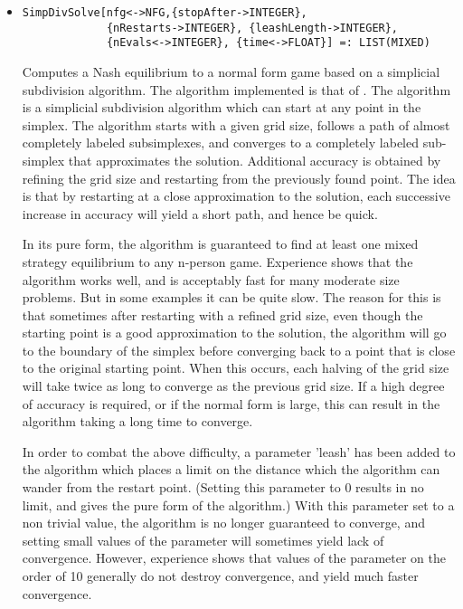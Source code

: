 \begin{itemize}
\item
\protect \large \begin{verbatim}
SimpDivSolve[nfg<->NFG,{stopAfter->INTEGER}, 
             {nRestarts->INTEGER}, {leashLength->INTEGER},
             {nEvals<->INTEGER}, {time<->FLOAT}] =: LIST(MIXED)
\end{verbatim}\normalsize

\bd
Computes a Nash equilibrium to a normal form game based
on a simplicial subdivision algorithm.  The algorithm implemented is
that of \cite{VTH:1987}.  The 
algorithm is a simplicial subdivision algorithm which can start at any
point in the simplex.  The algorithm starts with a given grid size,
follows a path of almost completely labeled subsimplexes, and
converges to a completely labeled sub-simplex that approximates the
solution.  Additional accuracy is obtained by refining the grid size
and restarting from the previously found point.  The idea is that by
restarting at a close approximation to the solution, each successive
increase in accuracy will yield a short path, and hence be quick.

In its pure form, the algorithm is guaranteed to find at least one
mixed strategy equilibrium to any n-person game.  Experience shows
that the algorithm works well, and is acceptably fast for many
moderate size problems.  But in some examples it can be quite slow.
The reason for this is that sometimes after restarting with a refined
grid size, even though the starting point is a good approximation to
the solution, the algorithm will go to the boundary of the simplex
before converging back to a point that is close to the original
starting point.  When this occurs, each halving of the grid size will
take twice as long to converge as the previous grid size.  If a high
degree of accuracy is required, or if the normal form is large, this
can result in the algorithm taking a long time to converge.

In order to combat the above difficulty, a parameter 'leash' has been
added to the algorithm which places a limit on the distance which the
algorithm can wander from the restart point. (Setting this parameter
to 0 results in no limit, and gives the pure form of the algorithm.)
With this parameter set to a non trivial value, the algorithm is no
longer guaranteed to converge, and setting small values of the
parameter will sometimes yield lack of convergence.  However,
experience shows that values of the parameter on the order of 10
generally do not destroy convergence, and yield much faster
convergence.


\end{itemize}
